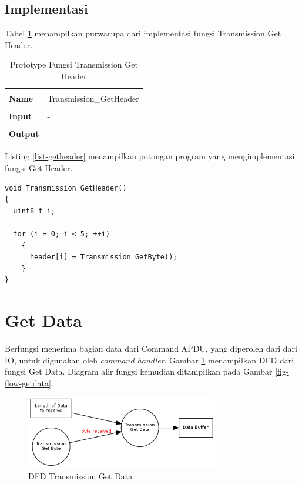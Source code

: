 \subsection {Implementasi}

Tabel \ref{tabel-getheader} menampilkan purwarupa dari implementasi fungsi Transmission Get Header.

\begin{table}[!h]
  \centering
  \begin{tabular}{p{2cm} p{8cm}}
    \hline\\
    {\bf Name} & Transmission\_GetHeader\\
    \hline\\
    {\bf Input} & -
    \\
    \hline\\
    {\bf Output} & -
    \\
    \hline
  \end{tabular}
  \caption{Prototype Fungsi Transmission Get Header}
  \label{tabel-getheader}
\end{table}

Listing \ref{list-getheader} menampilkan potongan program yang mengimplementasi fungsi Get Header.

\begin{lstlisting}[caption={Listing Program Fungsi Get Header}, label={list-getheader}]
void Transmission_GetHeader()
{
  uint8_t i;

  for (i = 0; i < 5; ++i)
    {
      header[i] = Transmission_GetByte();
    }
}
\end{lstlisting}


\section{Get Data}
\label{sec_getdata}

Berfungsi menerima bagian data dari Command APDU, yang diperoleh dari dari IO, untuk digunakan oleh \emph{command handler}. Gambar \ref{fig-dfd-getdata} menampilkan DFD dari fungsi Get Data. Diagram alir fungsi kemudian ditampilkan pada Gambar \ref{fig-flow-getdata}.

\begin{figure}[!h]
\centering
\includegraphics[width=0.75\textwidth]{image/transmission/dfd_getdata.png}
\caption{DFD Transmission Get Data}
\label{fig-dfd-getdata}
\end{figure}

